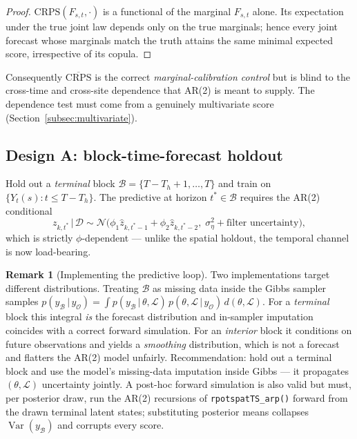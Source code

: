 \documentclass[11pt]{article}
\theoremstyle{definition}
\newtheorem{remark}{Remark}
\newcommand{\Var}{\operatorname{Var}}
\newcommand{\Norm}{\mathcal{N}}
\newcommand{\D}{\mathcal{D}}
\newcommand{\Ltot}{\mathcal{L}}
\newcommand{\given}{\,\vert\,}
\begin{document}
\begin{proof}
$\mathrm{CRPS}(F_{s,t},\cdot)$ is a functional of the marginal
$F_{s,t}$ alone. Its expectation under the true joint law depends only
on the true marginals; hence every joint forecast whose marginals
match the truth attains the same minimal expected score, irrespective
of its copula.
\end{proof}

Consequently $\overline{\mathrm{CRPS}}$ is the correct
\emph{marginal-calibration control} but is blind to the cross-time and
cross-site dependence that AR(2) is meant to supply. The dependence
test must come from a genuinely multivariate score
(Section~\ref{subsec:multivariate}).

\subsection{Design A: block-time-forecast holdout}
\label{subsec:designA}

Hold out a \emph{terminal} block $\mathcal B = \{T-T_h+1,\dots,T\}$ and
train on $\{Y_t(s):t\le T-T_h\}$. The predictive at horizon
$t^*\in\mathcal B$ requires the AR(2) conditional
\begin{equation}
  z_{k,t^*}\given\D \sim
    \Norm\!\big(\phi_1\hat z_{k,t^*-1}+\phi_2\hat z_{k,t^*-2},\;
                \sigma_\eta^2+\text{filter uncertainty}\big),
  \label{eq:forecast-conditional}
\end{equation}
which is strictly $\phi$-dependent --- unlike the spatial holdout, the
temporal channel is now load-bearing.

\begin{remark}[Implementing the predictive loop]
\label{rem:predictive-loop}
Two implementations target different distributions. Treating
$\mathcal B$ as missing data inside the Gibbs sampler samples
$p(y_\mathcal{B}\given y_\mathcal{O}) = \int p(y_\mathcal{B}\given
\theta,\Ltot)\,p(\theta,\Ltot\given y_\mathcal{O})\,d(\theta,\Ltot)$.
For a \emph{terminal} block this integral \emph{is} the forecast
distribution and in-sampler imputation coincides with a correct forward
simulation. For an \emph{interior} block it conditions on future
observations and yields a \emph{smoothing} distribution, which is not a
forecast and flatters the AR(2) model unfairly. Recommendation: hold
out a terminal block and use the model's missing-data imputation inside
Gibbs --- it propagates $(\theta,\Ltot)$ uncertainty jointly. A
post-hoc forward simulation is also valid but must, per posterior draw,
run the AR(2) recursions of \verb|rpotspatTS_arp()| forward from the
drawn terminal latent states; substituting posterior means collapses
$\Var(y_\mathcal{B})$ and corrupts every score.
\end{remark}
\end{document}
